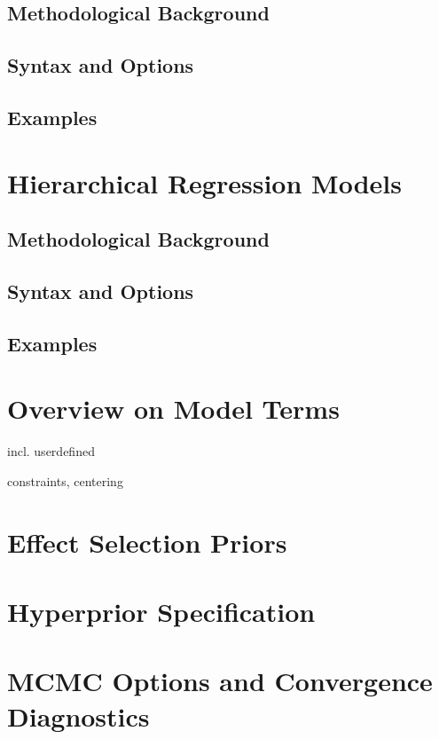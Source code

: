 \subsection{Methodological Background}

\subsection{Syntax and Options}

\subsection{Examples}

\section{Hierarchical Regression Models}

\subsection{Methodological Background}

\subsection{Syntax and Options}

\subsection{Examples}

\section{Overview on Model Terms}

incl. userdefined

constraints, centering

\section{Effect Selection Priors}

\section{Hyperprior Specification}

\section{MCMC Options and Convergence Diagnostics}


